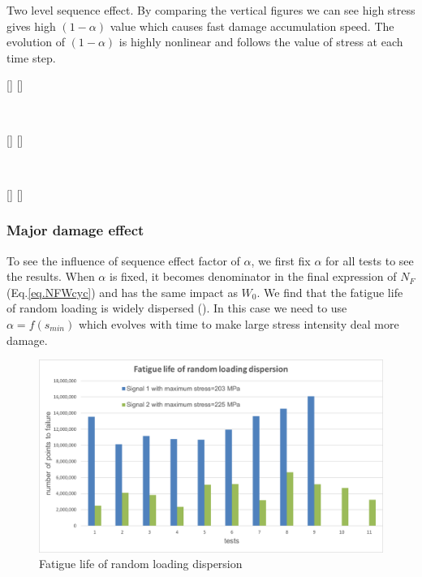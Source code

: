 \begin{Figure}[]{Two level sequence effect. By comparing the vertical figures we can see high stress gives high $(1-\alpha)$ value which causes fast damage accumulation speed. The evolution of $(1-\alpha)$ is highly nonlinear and follows the value of stress at each time step.}
\centerline{
[]
[]}
\\
\centerline{
[]
[]}
\\
\centerline{
[]
[]}
\label{sequence}
\end{Figure}


\clearpage
\subsubsection{Major damage effect}

To see the influence of sequence effect factor of $\alpha$, we first fix $\alpha$ for all tests to see the results. When $\alpha$ is fixed, it becomes denominator in the final expression of $N_F$ (Eq.\eqref{eq.NFWcyc}) and has the same impact as $W_0$. We find  that the fatigue life of random loading is widely dispersed (). In this case we need to use $\alpha=f(s_{min})$ which evolves with time to make large stress intensity deal more damage.

\begin{figure}[!h]
	\centering
	\includegraphics[width=\textwidth]{figures//randomdispersion.png} 
	\caption{Fatigue life of random loading dispersion}
	\label{fig.randomdispersion}
\end{figure}

